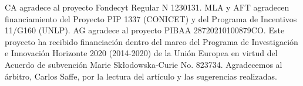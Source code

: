 \documentclass[baaa]{baaa}
\begin{document}


\begin{acknowledgement}
CA agradece al proyecto Fondecyt Regular N 1230131. MLA y AFT agradecen financiamiento del Proyecto PIP 1337 (CONICET) y del Programa de Incentivos 11/G160 (UNLP). AG agradece al proyecto PIBAA 28720210100879CO. Este proyecto ha recibido financiaci\'on dentro del marco del Programa de Investigaci\'on e Innovaci\'on Horizonte 2020 (2014-2020) de la Uni\'on Europea en virtud del Acuerdo de subvenci\'on Marie Sk\l{}odowska-Curie No. 823734.
Agradecemos al \'arbitro, Carlos Saffe, por la lectura del art\'iculo y las sugerencias realizadas.
\end{acknowledgement}


\small

 
\end{document}
